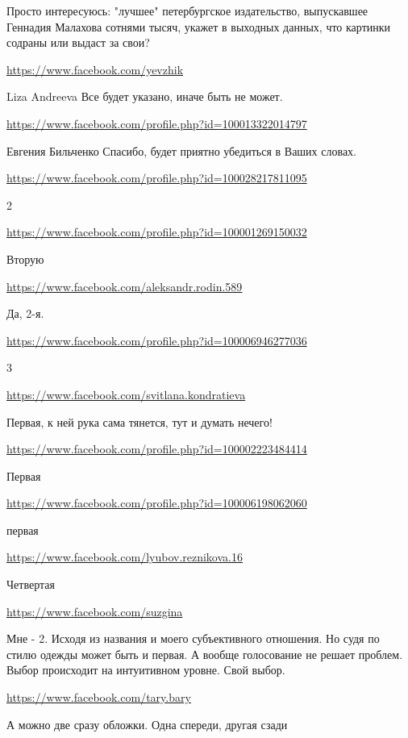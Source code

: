 \documentclass[a4paper,11pt]{extreport}
\begin{document}
\begin{itemize}
Просто интересуюсь: "лучшее" петербургское издательство, выпускавшее Геннадия Малахова сотнями тысяч, укажет в выходных данных, что картинки содраны или выдаст за свои?

\begin{itemize}
\url{https://www.facebook.com/yevzhik}

Liza Andreeva Все будет указано, иначе быть не может.

\url{https://www.facebook.com/profile.php?id=100013322014797}

Евгения Бильченко Спасибо, будет приятно убедиться в Ваших словах.

\end{itemize}
\url{https://www.facebook.com/profile.php?id=100028217811095}

2

\url{https://www.facebook.com/profile.php?id=100001269150032}

Вторую

\url{https://www.facebook.com/aleksandr.rodin.589}

Да, 2-я.

\url{https://www.facebook.com/profile.php?id=100006946277036}

3

\url{https://www.facebook.com/svitlana.kondratieva}

Первая, к ней рука сама тянется, тут и думать нечего!

\url{https://www.facebook.com/profile.php?id=100002223484414}

Первая

\url{https://www.facebook.com/profile.php?id=100006198062060}

первая

\url{https://www.facebook.com/lyubov.reznikova.16}

Четвертая

\url{https://www.facebook.com/suzgina}

Мне - 2. Исходя из названия и моего субъективного отношения. Но судя по стилю одежды может быть и первая. А вообще голосование не решает проблем. Выбор происходит на интуитивном уровне. Свой выбор.

\url{https://www.facebook.com/tary.bary}

А можно две сразу обложки. Одна спереди, другая сзади

\end{itemize}
\end{document}
